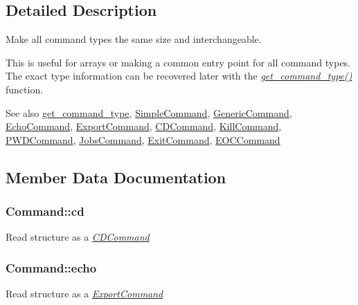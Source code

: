\subsection{Detailed Description}
Make all command types the same size and interchangeable. 

This is useful for arrays or making a common entry point for all command types. The exact type information can be recovered later with the {\itshape \hyperlink{command_8c_a1708aa65874060aa7ef99bf9e1671f5c}{get\+\_\+command\+\_\+type()}} function.

\begin{DoxySeeAlso}{See also}
\hyperlink{command_8h_a1708aa65874060aa7ef99bf9e1671f5c}{get\+\_\+command\+\_\+type}, \hyperlink{structSimpleCommand}{Simple\+Command}, \hyperlink{structGenericCommand}{Generic\+Command}, \hyperlink{command_8h_a8dc22d719c880c1ffcd9bc2dc5773633}{Echo\+Command}, \hyperlink{structExportCommand}{Export\+Command}, \hyperlink{structCDCommand}{C\+D\+Command}, \hyperlink{structKillCommand}{Kill\+Command}, \hyperlink{command_8h_a0c0e44e3e2b07b1e9b48023205cb4ca2}{P\+W\+D\+Command}, \hyperlink{command_8h_a027de4ed5fe4b0313c6c8ee0c2c1806b}{Jobs\+Command}, \hyperlink{command_8h_a354cb87bc40859e5595de56b675732bc}{Exit\+Command}, \hyperlink{command_8h_ae5bf5cf7a34428c221f28179034dd125}{E\+O\+C\+Command} 
\end{DoxySeeAlso}


\subsection{Member Data Documentation}
\subsubsection[{\texorpdfstring{cd}{cd}}]{ Command\+::cd}\hypertarget{unionCommand_a488c8f6e6ce10f7c9126f37c5f37776d}{}\label{unionCommand_a488c8f6e6ce10f7c9126f37c5f37776d}
Read structure as a {\itshape \hyperlink{structCDCommand}{C\+D\+Command}} 
\subsubsection[{\texorpdfstring{echo}{echo}}]{ Command\+::echo}\hypertarget{unionCommand_a74de4769cc35dac9a3f7dfd24cb87ad7}{}\label{unionCommand_a74de4769cc35dac9a3f7dfd24cb87ad7}
Read structure as a {\itshape \hyperlink{structExportCommand}{Export\+Command}} 
